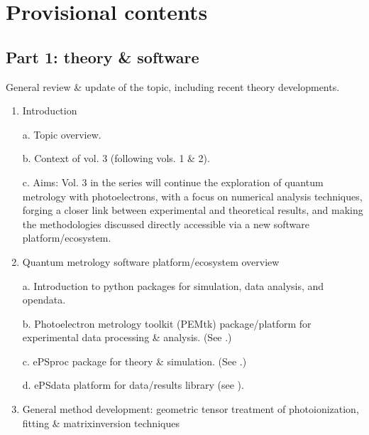 \documentclass[letterpaper,table,10pt,english]{jupyterBook}
\begin{document}
\section{Provisional contents}
\label{\detokenize{frontmatter/overview_270122:provisional-contents}}

\subsection{Part 1: theory \& software}
\label{\detokenize{frontmatter/overview_270122:part-1-theory-software}}
\sphinxAtStartPar
General review \& update of the topic, including recent theory developments.
\begin{enumerate}
%
\item {} 
\sphinxAtStartPar
Introduction

\sphinxAtStartPar
a.  Topic overview.

\sphinxAtStartPar
b.  Context of vol. 3 (following vols. 1 \& 2).

\sphinxAtStartPar
c.  Aims: Vol. 3 in the series will continue the exploration of quantum metrology with photoelectrons, with a focus on numerical analysis techniques, forging a closer link between experimental and theoretical results, and making the methodologies discussed directly accessible via a new software platform/ecosystem.

\item {} 
\sphinxAtStartPar
Quantum metrology software platform/ecosystem overview

\sphinxAtStartPar
a.  Introduction to python packages for simulation, data analysis, and open\sphinxhyphen{}data.

\sphinxAtStartPar
b.  Photoelectron metrology toolkit (PEMtk) package/platform for experimental data processing \& analysis. (See .)

\sphinxAtStartPar
c.  ePSproc package for theory \& simulation. (See .)

\sphinxAtStartPar
d.  ePSdata platform for data/results library (see ).

\item {} 
\sphinxAtStartPar
General method development: geometric tensor treatment of
photoionization, fitting \& matrix\sphinxhyphen{}inversion techniques


\end{enumerate}
\end{document}
